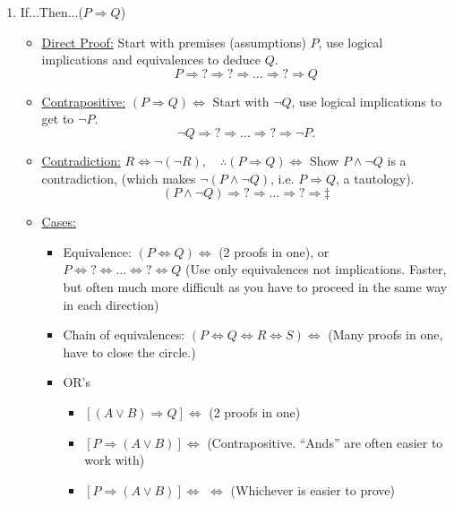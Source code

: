 \documentclass{article}
\begin{document}
\begin{enumerate}
		\item  If...Then...($P\Rightarrow Q$)
		\begin{itemize}
			\item \underline{Direct Proof:} Start with premises (assumptions) $P$, use logical implications and equivalences to deduce $Q.$  $$P\Rightarrow ?\Rightarrow ?\Rightarrow\dots\Rightarrow ?\Rightarrow Q$$
			\item \underline{Contrapositive:} $(P\Rightarrow Q)\Leftrightarrow$  \newline
			Start with $\neg Q$, use logical implications to get to $\neg P.$ $$\neg Q\Rightarrow ?\Rightarrow\dots\Rightarrow ?\Rightarrow \neg P.$$
			\item \underline{Contradiction:} $R\Leftrightarrow \neg(\neg R),\quad\therefore (P\Rightarrow Q)\Leftrightarrow$  \newline
			Show $P\wedge\neg Q$ is a contradiction, (which makes $\neg(P\wedge\neg Q)$, i.e. $P\Rightarrow Q$, a tautology).  $$(P\wedge\neg Q)\Rightarrow ?\Rightarrow\dots\Rightarrow ?\Rightarrow \ddagger$$
			\item \underline{Cases:}
			\begin{itemize}
				\item Equivalence: $(P\Leftrightarrow Q)\Leftrightarrow$  (2 proofs in one), or \newline
				$P\Leftrightarrow ?\Leftrightarrow \dots \Leftrightarrow ?\Leftrightarrow Q$ (Use only equivalences not implications. Faster, but often much more difficult as you have to proceed in the same way in each direction)
				\item Chain of equivalences: $(P\Leftrightarrow Q\Leftrightarrow R\Leftrightarrow S)\Leftrightarrow$  (Many proofs in one, have to close the circle.)
				\item OR's
				\begin{itemize}
					\item $[(A\vee B)\Rightarrow Q]\Leftrightarrow$  (2 proofs in one)
					\item $[P\Rightarrow (A\vee B)]\Leftrightarrow$  (Contrapositive. ``Ands'' are often easier to work with)
					\item $[P\Rightarrow (A\vee B)]\Leftrightarrow$  $\Leftrightarrow$  (Whichever is easier to prove)

\end{itemize}
\end{itemize}
\end{itemize}
\end{enumerate}
\end{document}
